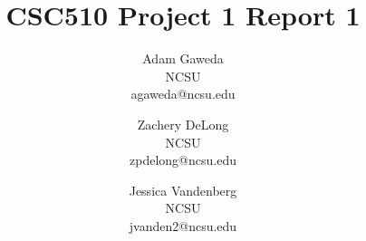 \documentclass{article}
\begin{document}
\title{CSC510 Project 1 Report 1}
\date{} %

\author{{\large Adam Gaweda}\\NCSU\\agaweda@ncsu.edu \and {\large Zachery DeLong}\\NCSU\\zpdelong@ncsu.edu \and {\large Jessica Vandenberg}\\NCSU\\jvanden2@ncsu.edu }

\maketitle







\end{document}
